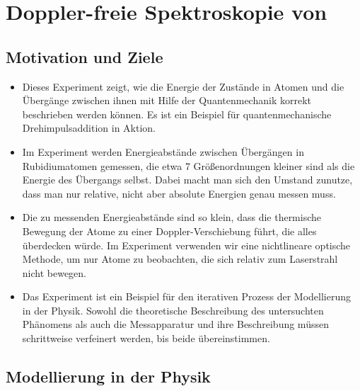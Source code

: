 
\chapter*{Doppler-freie Spektroskopie von }

	
\section{Motivation und Ziele}

\begin{itemize}
	\item Dieses Experiment zeigt, wie die Energie der Zustände in Atomen und die Übergänge zwischen ihnen mit Hilfe der Quantenmechanik korrekt beschrieben werden können. Es ist ein Beispiel für quantenmechanische Drehimpulsaddition in Aktion.
	
	\item Im Experiment werden Energieabstände zwischen Übergängen in Rubidiumatomen gemessen, die etwa 7 Größenordnungen kleiner sind als die Energie des Übergangs selbst. Dabei macht man sich den Umstand zunutze, dass man nur relative, nicht aber absolute Energien genau messen muss.
	
	\item Die zu messenden Energieabstände sind so klein, dass die thermische Bewegung der Atome zu einer Doppler-Verschiebung führt, die alles überdecken würde. Im Experiment verwenden wir eine nichtlineare optische Methode, um nur Atome zu beobachten, die sich  relativ zum Laserstrahl nicht bewegen.
	
	\item Das Experiment ist ein Beispiel für den iterativen Prozess der Modellierung in der Physik. Sowohl die theoretische Beschreibung des untersuchten Phänomens als auch die Messapparatur und ihre Beschreibung müssen schrittweise verfeinert werden, bis beide übereinstimmen.
	
\end{itemize}



\nocite{Hertel2015,Meschede,DemtL1,DemtL2,Gert,Dem3,Dem4}

\section{Modellierung in der Physik}



